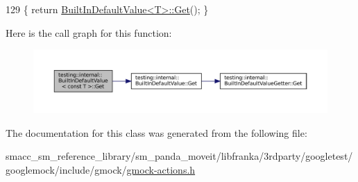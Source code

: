 \begin{DoxyCode}
129 \{ \textcolor{keywordflow}{return} \hyperlink{classtesting_1_1internal_1_1BuiltInDefaultValue_a7e26c1df14a887c8f393b29d6ea162e6}{BuiltInDefaultValue<T>::Get}(); \}
\end{DoxyCode}
Here is the call graph for this function\+:
\nopagebreak
\begin{figure}[H]
\begin{center}
\leavevmode
\includegraphics[width=350pt]{classtesting_1_1internal_1_1BuiltInDefaultValue_3_01const_01T_01_4_a5996754952ecbcc5da77a2cebd4722de_cgraph}
\end{center}
\end{figure}


The documentation for this class was generated from the following file\+:\begin{DoxyCompactItemize}
\item 
smacc\+\_\+sm\+\_\+reference\+\_\+library/sm\+\_\+panda\+\_\+moveit/libfranka/3rdparty/googletest/googlemock/include/gmock/\hyperlink{gmock-actions_8h}{gmock-\/actions.\+h}\end{DoxyCompactItemize}
